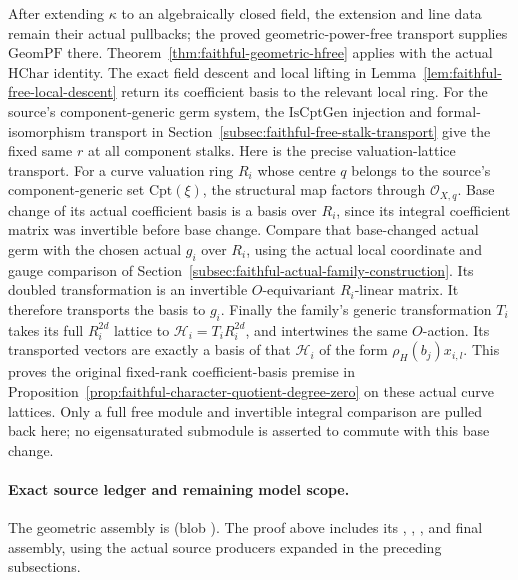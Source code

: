 After extending \(\kappa\) to an algebraically closed field,
the extension and line data remain their actual pullbacks;
the proved geometric-power-free transport supplies
\(\mathrm{GeomPF}\) there.
Theorem~\ref{thm:faithful-geometric-hfree} applies with the
actual \(\mathrm{HChar}\) identity.
The exact field descent and local lifting in
Lemma~\ref{lem:faithful-free-local-descent} return its
coefficient basis to the relevant local ring.
For the source's component-generic germ system, the
\(\mathrm{IsCptGen}\) injection and formal-isomorphism
transport in
Section~\ref{subsec:faithful-free-stalk-transport}
give the fixed same \(r\) at all component stalks.
Here is the precise valuation-lattice transport.
For a curve valuation ring \(R_i\) whose centre \(q\) belongs to
the source's component-generic set \(\mathrm{Cpt}(\xi)\),
the structural map factors through \(\mathcal O_{X,q}\).
Base change of its actual coefficient basis is a basis
over \(R_i\), since its integral coefficient matrix was
invertible before base change.
Compare that base-changed actual germ with the chosen
actual \(g_i\) over \(R_i\), using the actual local
coordinate and gauge comparison of
Section~\ref{subsec:faithful-actual-family-construction}.
Its doubled transformation is an invertible
\(O\)-equivariant \(R_i\)-linear matrix.
It therefore transports the basis to \(g_i\).
Finally the family's generic transformation \(T_i\)
takes its full \(R_i^{2d}\) lattice to
\(\mathcal H_i=T_iR_i^{2d}\), and intertwines the
same \(O\)-action.  Its transported vectors are exactly
a basis of that \(\mathcal H_i\) of the form
\(\rho_H(b_j)x_{i,l}\).
This proves the original fixed-rank coefficient-basis
premise in
Proposition~\ref{prop:faithful-character-quotient-degree-zero}
on these actual curve lattices.
Only a full free module and invertible integral comparison
are pulled back here; no eigensaturated submodule is
asserted to commute with this base change.

\paragraph{Exact source ledger and remaining model scope.}
The geometric assembly is
\href{https://github.com/ChristianKudeba/alpoge-rh-verification/blob/alpoge-source-7cbf7a0c/src/Development/AutomorphicSpectrum/Proofs/GeometryProofs/HeightCharFreeGeometric.lean}
{}
(blob ).
The proof above includes its ,
, , and final assembly,
using the actual source producers expanded in the preceding
subsections.

